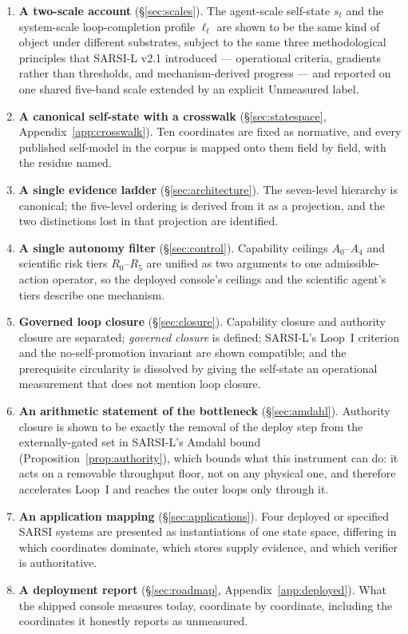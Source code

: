 \documentclass[11pt]{article}
\begin{document}
\begin{enumerate}[leftmargin=1.6em,itemsep=3pt]
\item \textbf{A two-scale account} (\S\ref{sec:scales}). The agent-scale self-state $s_t$ and the system-scale loop-completion profile $\ell_t$ are shown to be the same kind of object under different substrates, subject to the same three methodological principles that SARSI-L v2.1 introduced --- operational criteria, gradients rather than thresholds, and mechanism-derived progress --- and reported on one shared five-band scale extended by an explicit \textsf{Unmeasured} label.
\item \textbf{A canonical self-state with a crosswalk} (\S\ref{sec:statespace}, Appendix~\ref{app:crosswalk}). Ten coordinates are fixed as normative, and every published self-model in the corpus is mapped onto them field by field, with the residue named.
\item \textbf{A single evidence ladder} (\S\ref{sec:architecture}). The seven-level hierarchy is canonical; the five-level ordering is derived from it as a projection, and the two distinctions lost in that projection are identified.
\item \textbf{A single autonomy filter} (\S\ref{sec:control}). Capability ceilings $A_0$--$A_4$ and scientific risk tiers $R_0$--$R_5$ are unified as two arguments to one admissible-action operator, so the deployed console's ceilings and the scientific agent's tiers describe one mechanism.
\item \textbf{Governed loop closure} (\S\ref{sec:closure}). Capability closure and authority closure are separated; \emph{governed closure} is defined; SARSI-L's Loop~I criterion and the no-self-promotion invariant are shown compatible; and the prerequisite circularity is dissolved by giving the self-state an operational measurement that does not mention loop closure.
\item \textbf{An arithmetic statement of the bottleneck} (\S\ref{sec:amdahl}). Authority closure is shown to be exactly the removal of the deploy step from the externally-gated set in SARSI-L's Amdahl bound (Proposition~\ref{prop:authority}), which bounds what this instrument can do: it acts on a removable throughput floor, not on any physical one, and therefore accelerates Loop~I and reaches the outer loops only through it.
\item \textbf{An application mapping} (\S\ref{sec:applications}). Four deployed or specified SARSI systems are presented as instantiations of one state space, differing in which coordinates dominate, which stores supply evidence, and which verifier is authoritative.
\item \textbf{A deployment report} (\S\ref{sec:roadmap}, Appendix~\ref{app:deployed}). What the shipped console measures today, coordinate by coordinate, including the coordinates it honestly reports as unmeasured.
\end{enumerate}
\end{document}
